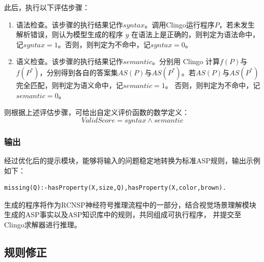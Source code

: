 此后，执行以下评估步骤：
\begin{enumerate}[nosep]
\item 语法检查。该步骤的执行结果记作$syntax$。调用Clingo运行程序$P$，若未发生解析错误，则认为模型生成的程序 $y$ 在语法上是正确的，则判定为语法命中，记$syntax = 1$。否则，则判定为不命中，记$syntax = 0$。
\item 语义检查。该步骤的执行结果记作$semantic$。分别用 Clingo 计算$f(P)$与$f(P^*)$，分别得到各自的答案集$AS(P)$与$AS(P^*)$。若$AS(P)$与$AS(P^*)$完全匹配，则判定为语义命中，记$semantic = 1$。
否则，则判定为不命中，记$semantic = 0$。
\end{enumerate}

则根据上述评估步骤，可给出自定义评价函数的数学定义：
$$ValidScore = syntax \land semantic $$
\subsubsection{输出}
经过优化后的提示模块，能够将输入的问题稳定地转换为标准ASP规则，输出示例如下：
\begin{lstlisting}
missing(Q):-hasProperty(X,size,Q),hasProperty(X,color,brown).
\end{lstlisting}

生成的程序将作为RCNSP神经符号推理流程中的一部分，结合视觉场景理解模块生成的ASP事实以及ASP知识库中的规则，共同组成可执行程序，
并提交至Clingo求解器进行推理。

\subsection{规则修正}
